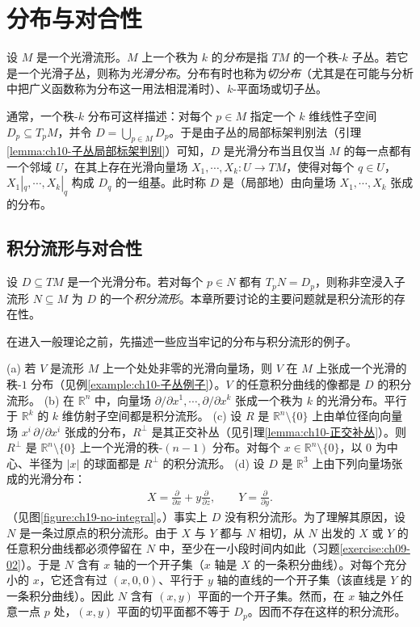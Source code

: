 \documentclass[../../main.tex]{subfiles}
\begin{document}
\section{分布与对合性}\label{section:ch19-distributions-involutivity}

设 $M$ 是一个光滑流形。$M$ 上一个秩为 $k$ 的\emph{分布}是指 $TM$ 的一个秩-$k$ 子丛。若它是一个光滑子丛，则称为\emph{光滑分布}。分布有时也称为\emph{切分布}（尤其是在可能与分析中把广义函数称为分布这一用法相混淆时）、$k$-平面场或切子丛。

通常，一个秩-$k$ 分布可这样描述：对每个 $p\in M$ 指定一个 $k$ 维线性子空间 $D_p\subseteq T_pM$，并令 $D=\bigcup_{p\in M}D_p$。于是由子丛的局部标架判别法（引理\cref{lemma:ch10-子丛局部标架判别}）可知，$D$ 是光滑分布当且仅当 $M$ 的每一点都有一个邻域 $U$，在其上存在光滑向量场 $X_1,\cdots ,X_k\colon U\to TM$，使得对每个 $q\in U$，$X_1|_q,\cdots ,X_k|_q$ 构成 $D_q$ 的一组基。此时称 $D$ 是（局部地）由向量场 $X_1,\cdots ,X_k$ 张成的分布。

\subsection{积分流形与对合性}

设 $D\subseteq TM$ 是一个光滑分布。若对每个 $p\in N$ 都有 $T_pN=D_p$，则称非空浸入子流形 $N\subseteq M$ 为 $D$ 的一个\emph{积分流形}。本章所要讨论的主要问题就是积分流形的存在性。

在进入一般理论之前，先描述一些应当牢记的分布与积分流形的例子。

\begin{example}[分布与积分流形]\label{example:ch19-分布与积分流形}
(a) 若 $V$ 是流形 $M$ 上一个处处非零的光滑向量场，则 $V$ 在 $M$ 上张成一个光滑的秩-$1$ 分布（见例\cref{example:ch10-子丛例子}）。$V$ 的任意积分曲线的像都是 $D$ 的积分流形。
(b) 在 $\mathbb{R}^n$ 中，向量场 $\partial/\partial x^1,\cdots ,\partial/\partial x^k$ 张成一个秩为 $k$ 的光滑分布。平行于 $\mathbb{R}^k$ 的 $k$ 维仿射子空间都是积分流形。
(c) 设 $R$ 是 $\mathbb{R}^n\setminus\{0\}$ 上由单位径向向量场 $x^i\,\partial/\partial x^i$ 张成的分布，$R^\perp$ 是其正交补丛（见引理\cref{lemma:ch10-正交补丛}）。则 $R^\perp$ 是 $\mathbb{R}^n\setminus\{0\}$ 上一个光滑的秩-$(n-1)$ 分布。对每个 $x\in\mathbb{R}^n\setminus\{0\}$，以 $0$ 为中心、半径为 $|x|$ 的球面都是 $R^\perp$ 的积分流形。
(d) 设 $D$ 是 $\mathbb{R}^3$ 上由下列向量场张成的光滑分布：
\begin{align*}
X=\frac{\partial}{\partial x}+y\frac{\partial}{\partial z},\qquad Y=\frac{\partial}{\partial y}.
\end{align*}
（见图\cref{figure:ch19-no-integral}。）事实上 $D$ 没有积分流形。为了理解其原因，设 $N$ 是一条过原点的积分流形。由于 $X$ 与 $Y$ 都与 $N$ 相切，从 $N$ 出发的 $X$ 或 $Y$ 的任意积分曲线都必须停留在 $N$ 中，至少在一小段时间内如此（习题\cref{exercise:ch09-02}）。于是 $N$ 含有 $x$ 轴的一个开子集（$x$ 轴是 $X$ 的一条积分曲线）。对每个充分小的 $x$，它还含有过 $(x,0,0)$、平行于 $y$ 轴的直线的一个开子集（该直线是 $Y$ 的一条积分曲线）。因此 $N$ 含有 $(x,y)$ 平面的一个开子集。然而，在 $x$ 轴之外任意一点 $p$ 处，$(x,y)$ 平面的切平面都不等于 $D_p$。因而不存在这样的积分流形。
\end{example}
\end{document}
